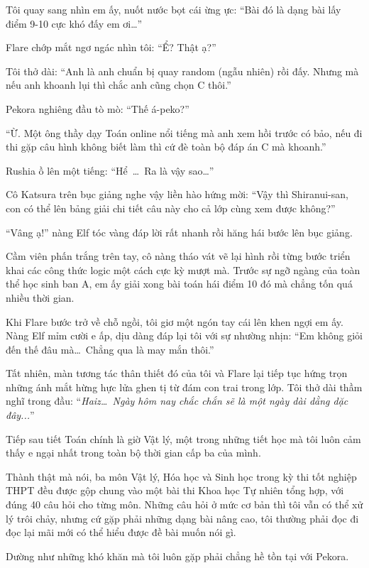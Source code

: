 \documentclass[../main.tex]{subfiles}
\begin{document}
Tôi quay sang nhìn em ấy, nuốt nước bọt cái ừng ực: ``Bài đó là dạng bài lấy điểm 9-10 cực khó đấy em ơi\dots''

Flare chớp mắt ngơ ngác nhìn tôi: ``Ể? Thật ạ?''

Tôi thở dài: ``Anh là anh chuẩn bị quay random (ngẫu nhiên) rồi đấy. Nhưng mà nếu anh khoanh lụi thì chắc anh cũng chọn C thôi.''

Pekora nghiêng đầu tò mò: ``Thế á-peko?''

``Ừ. Một ông thầy dạy Toán online nổi tiếng mà anh xem hồi trước có bảo, nếu đi thi gặp câu hình không biết làm thì cứ đè toàn bộ đáp án C mà khoanh.''

Rushia ồ lên một tiếng: ``Hể~\dots\ Ra là vậy sao\dots''

Cô Katsura trên bục giảng nghe vậy liền hào hứng mời: ``Vậy thì Shiranui-san, con có thể lên bảng giải chi tiết câu này cho cả lớp cùng xem được không?''

``Vâng ạ!'' nàng Elf tóc vàng đáp lời rất nhanh rồi hăng hái bước lên bục giảng.

Cầm viên phấn trắng trên tay, cô nàng tháo vát vẽ lại hình rồi từng bước triển khai các công thức logic một cách cực kỳ mượt mà. Trước sự ngỡ ngàng của toàn thể học sinh ban A, em ấy giải xong bài toán hái điểm 10 đó mà chẳng tốn quá nhiều thời gian.

Khi Flare bước trở về chỗ ngồi, tôi giơ một ngón tay cái lên khen ngợi em ấy. Nàng Elf mỉm cười e ấp, dịu dàng đáp lại tôi với sự nhường nhịn: ``Em không giỏi đến thế đâu mà\dots\ Chẳng qua là may mắn thôi.''

Tất nhiên, màn tương tác thân thiết đó của tôi và Flare lại tiếp tục hứng trọn những ánh mắt hừng hực lửa ghen tị từ đám con trai trong lớp. Tôi thở dài thầm nghĩ trong đầu: ``\textit{Haiz\dots\ Ngày hôm nay chắc chắn sẽ là một ngày dài dằng dặc đây...}''

\ct

Tiếp sau tiết Toán chính là giờ Vật lý, một trong những tiết học mà tôi luôn cảm thấy e ngại nhất trong toàn bộ thời gian cấp ba của mình.

Thành thật mà nói, ba môn Vật lý, Hóa học và Sinh học trong kỳ thi tốt nghiệp THPT đều được gộp chung vào một bài thi Khoa học Tự nhiên tổng hợp, với đúng 40 câu hỏi cho từng môn. Những câu hỏi ở mức cơ bản thì tôi vẫn có thể xử lý trôi chảy, nhưng cứ gặp phải những dạng bài nâng cao, tôi thường phải đọc đi đọc lại mãi mới có thể hiểu được đề bài muốn nói gì.

Dường như những khó khăn mà tôi luôn gặp phải chẳng hề tồn tại với Pekora.
\end{document}
